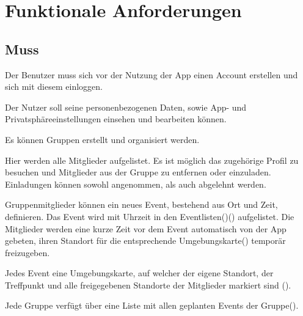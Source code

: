 \documentclass[parskip=full,11pt]{scrartcl}
\begin{document}

\section{Funktionale Anforderungen}

\subsection{Muss}

Der Benutzer muss sich vor der Nutzung der App einen Account erstellen und sich mit diesem
einloggen.

Der Nutzer soll seine personenbezogenen Daten,
sowie App- und Privatsphäreeinstellungen einsehen und bearbeiten können.


Es können Gruppen erstellt und organisiert werden.

Hier werden alle Mitglieder aufgelistet.
Es ist möglich das zugehörige Profil zu besuchen und Mitglieder aus der Gruppe zu entfernen oder einzuladen.
Einladungen können sowohl angenommen, als auch abgelehnt werden.

Gruppenmitglieder können ein neues Event, bestehend aus Ort und Zeit, definieren.
Das Event wird mit Uhrzeit in den Eventlisten()() aufgelistet.
Die Mitglieder werden eine kurze Zeit vor dem Event automatisch von der App gebeten,
ihren Standort für die entsprechende Umgebungskarte() temporär freizugeben.

Jedes Event eine Umgebungskarte, auf welcher der eigene Standort,
der Treffpunkt und alle freigegebenen Standorte der Mitglieder markiert sind ().

Jede Gruppe verfügt über eine Liste mit allen geplanten Events der Gruppe().
\end{document}
